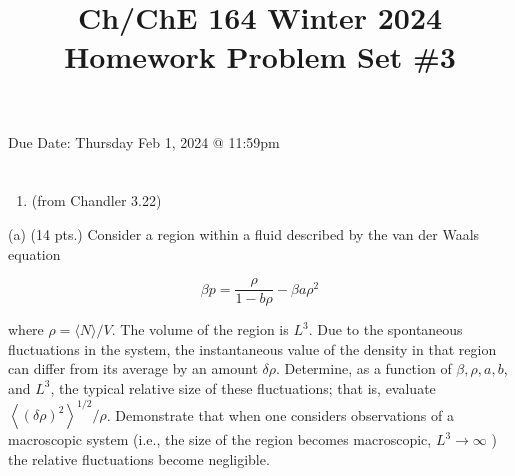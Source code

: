 \documentclass[12pt]{article}
\title{Ch/ChE 164 Winter 2024 
 Homework Problem Set \#3 }
\author{}
\date{}
\begin{document}
\maketitle
Due Date: Thursday Feb 1, 2024 @ 11:59pm
\section{}
\begin{enumerate}
  \item (from Chandler 3.22)
\end{enumerate}

(a) (14 pts.) Consider a region within a fluid described by the van der Waals equation

$$
\beta p=\frac{\rho}{1-b \rho}-\beta a \rho^{2}
$$

where $\rho=\langle N\rangle / V$. The volume of the region is $L^{3}$. Due to the spontaneous fluctuations in the system, the instantaneous value of the density in that region can differ from its average by an amount $\delta \rho$. Determine, as a function of $\beta, \rho, a, b$, and $L^{3}$, the typical relative size of these fluctuations; that is, evaluate $\left\langle(\delta \rho)^{2}\right\rangle^{1 / 2} / \rho$. Demonstrate that when one considers observations of a macroscopic system (i.e., the size of the region becomes macroscopic, $L^{3} \rightarrow \infty$ ) the relative fluctuations become negligible.
\end{document}
